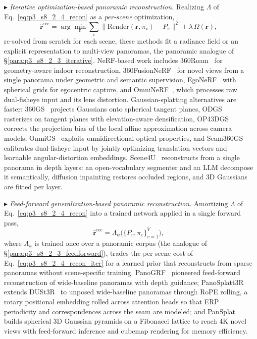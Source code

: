 $\blacktriangleright$ \textit{Iterative optimization-based panoramic reconstruction.} Realizing $\Lambda$ of Eq.~\eqref{eq:p3_s8_2_4_recon} as a \emph{per-scene} optimization,
\begin{equation}
\hat{\mathbf{r}}^{\text{rec}} = \arg\min_{\mathbf{r}} \sum_{v} \big\| \mathrm{Render}(\mathbf{r},\pi_v) - P_v \big\|^2 + \lambda\,\Omega(\mathbf{r}),
\label{eq:p3_s8_2_4_recon_iter}
\end{equation}
re-solved from scratch for each scene, these methods fit a radiance field or an explicit representation to multi-view panoramas, the panoramic analogue of §\ref{para:p3_s8_2_3_iterative}.
NeRF-based work includes 360Roam~\cite{huang2022360roam} for geometry-aware indoor reconstruction, 360FusionNeRF~\cite{kulkarni2023fusion} for novel views from a single panorama under geometric and semantic supervision, EgoNeRF~\cite{choi2023egonerf} with spherical grids for egocentric capture, and OmniNeRF~\cite{gu2022omninerf}, which processes raw dual-fisheye input and its lens distortion.
Gaussian-splatting alternatives are faster: 360GS~\cite{bai2024360gs} projects Gaussians onto spherical tangent planes, ODGS~\cite{lee2024odgs} rasterizes on tangent planes with elevation-aware densification, OP43DGS~\cite{wang2024op43dgs} corrects the projection bias of the local affine approximation across camera models, OmniGS~\cite{li2024omnigs} exploits omnidirectional optical properties, and Seam360GS~\cite{seam360gs} calibrates dual-fisheye input by jointly optimizing translation vectors and learnable angular-distortion embeddings.
Scene4U~\cite{scene4u} reconstructs from a single panorama in depth layers: an open-vocabulary segmenter and an LLM decompose it semantically, diffusion inpainting restores occluded regions, and 3D Gaussians are fitted per layer.

$\blacktriangleright$ \textit{Feed-forward generalization-based panoramic reconstruction.} Amortizing $\Lambda$ of Eq.~\eqref{eq:p3_s8_2_4_recon} into a trained network applied in a single forward pass,
\begin{equation}
\hat{\mathbf{r}}^{\text{rec}} = \Lambda_\psi\big(\{P_v, \pi_v\}_{v=1}^{V}\big),
\label{eq:p3_s8_2_4_recon_ff}
\end{equation}
where $\Lambda_\psi$ is trained once over a panoramic corpus (the analogue of §\ref{para:p3_s8_2_3_feedforward}), trades the per-scene cost of Eq.~\eqref{eq:p3_s8_2_4_recon_iter} for a learned prior that reconstructs from sparse panoramas without scene-specific training.
PanoGRF~\cite{chen2023panogrf} pioneered feed-forward reconstruction of wide-baseline panoramas with depth guidance; PanoSplatt3R~\cite{panosplatt3r} extends DUSt3R~\cite{wang2024dust3r} to unposed wide-baseline panoramas through RoPE rolling, a rotary positional embedding rolled across attention heads so that ERP periodicity and correspondences across the seam are modeled; and PanSplat~\cite{pansplat} builds spherical 3D Gaussian pyramids on a Fibonacci lattice to reach 4K novel views with feed-forward inference and cubemap rendering for memory efficiency.

